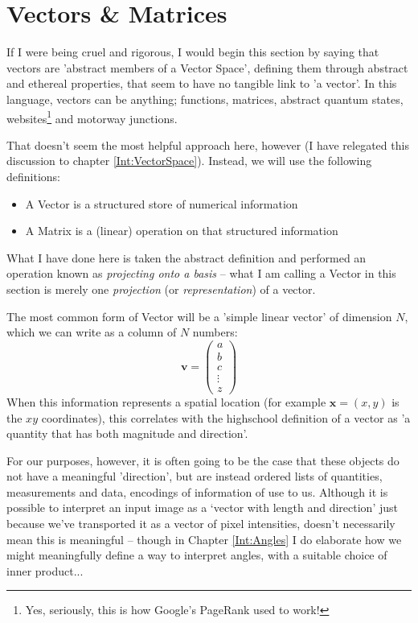 \documentclass[a4paper,openany,11pt]{book}
\renewcommand\vec[1]{\boldsymbol{\mathbf{#1}}}
\begin{document}
				

						
		
				
		\chapter{Vectors \& Matrices}\label{C:LinearAlgebra}

			If I were being cruel and rigorous, I would begin this section by saying that vectors are 'abstract members of a Vector Space', defining them through abstract and ethereal properties, that seem to have no tangible link to 'a vector'. In this language, vectors can be anything; functions, matrices, abstract quantum states, websites\footnote{Yes, seriously, this is how Google's PageRank used to work!} and motorway junctions. 

			That doesn't seem the most helpful approach here, however (I have relegated this discussion to chapter \ref{Int:VectorSpace}). Instead, we will use the following definitions:
			\begin{itemize}
				\item A Vector is a structured store of numerical information
				\item A Matrix is a (linear) operation on that structured information
			\end{itemize}

			What I have done here is taken the abstract definition and performed an operation known as \textit{projecting onto a basis} -- what I am calling a Vector in this section is merely one \textit{projection} (or \textit{representation}) of a vector.

			The most common form of Vector will be a 'simple linear vector' of dimension $N$, which we can write as a column of $N$ numbers:
			\begin{equation}
				\vec{v} = \begin{pmatrix}
					a \\ b \\ c \\ \vdots \\ z
				\end{pmatrix}
			\end{equation}
			When this information represents a spatial location (for example $\vec{x} = (x,y)$ is the $xy$ coordinates), this correlates with the highschool definition of a vector as 'a quantity that has both magnitude and direction'.
			
			For our purposes, however, it is often going to be the case that these objects do not have a meaningful 'direction', but are instead ordered lists of quantities, measurements and data, encodings of information of use to us. Although it is possible to interpret an input image as a `vector with length and direction' just because we've transported it as a vector of pixel intensities, doesn't necessarily mean this is meaningful -- though in Chapter \ref{Int:Angles} I do elaborate how we might meaningfully define a way to interpret angles, with a suitable choice of inner product...
			
\end{document}
